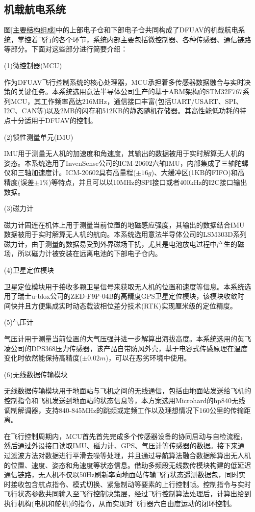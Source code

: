 \subsection{机载航电系统}

图\ref{主要结构组成}中的上部电子仓和下部电子仓共同构成了DFUAV的机载航电系统，掌控着飞行的各个环节，系统内部主要包括微控制器、各种传感器、通信链路等部分。下面对这些部分进行简要介绍：

(1)微控制器(MCU)

    作为DFUAV飞行控制系统的核心处理器，MCU承担着多传感器数据融合与实时决策的关键任务。本系统选用意法半导体公司生产的基于ARM架构的STM32F767系列MCU，其工作频率高达216MHz，通信接口丰富(包括UART/USART、SPI、I2C、CAN等)以及2MB的闪存和512KB的静态随机存储器。其高性能低功耗的特点十分适用于DFUAV的控制。

(2)惯性测量单元(IMU)

    IMU用于测量无人机的加速度和角速度，其输出的数据被用于实时解算无人机的姿态。本系统选用了InvenSense公司的ICM-20602六轴IMU，内部集成了三轴陀螺仪和三轴加速度计。ICM-20602具有高量程($\pm16g$)、大缓冲区(1KB的FIFO)和高精度(误差$\pm1\%$)等特点，并且可以以10MHz的SPI接口或者400kHz的I2C接口输出数据。

(3)磁力计

    磁力计固连在机体上用于测量当前位置的地磁感应强度，其输出的数据结合IMU数据被用于实时解算无人机的航向。本系统选用意法半导体公司的LSM303D系列磁力计，由于测量的数据易受到外界磁场干扰，尤其是电池放电过程中产生的磁场，所以磁力计被安装在远离电池的下部电子仓内。

(4)卫星定位模块

    卫星定位模块用于接收多颗卫星信号来获取无人机的位置和速度等信息。本系统选用了瑞士u-blox公司的ZED-F9P-04B的高精度GPS卫星定位模块，该模块收敛时间快并且方便集成实时动态载波相位差分技术(RTK)实现厘米级的定位精度。
    
(5)气压计

    气压计用于测量当前位置的大气压强并进一步解算出海拔高度。本系统选用的英飞凌公司的DPS368压力传感器，该产品自带防风外壳，基于电容式传感原理在温度变化时依然能保持高精度($\pm0.02m$)，可以在恶劣环境中使用。

(6)无线数据传输模块

    无线数据传输模块用于地面站与飞机之间的无线通信，包括由地面站发送给飞机的控制指令和飞机发送到地面站的状态信息等，本方案选用Microhard的hp840无线调制解调器，支持840-845MHz的跳频或定频工作以及理想情况下160公里的传输距离。

在飞行控制周期内，MCU首先首先完成多个传感器设备的协同启动与自检流程，然后通过外设接口读取IMU、磁力计、GPS、气压计等传感器的数据。接下来通过滤波方法对数据进行平滑去噪等处理，并且通过导航算法融合数据解算出无人机的位置、速度、姿态和角速度等状态信息。借助多频段无线数传模块构建的低延迟通信链路，无人机不仅以50Hz刷新率向地面站传输飞行状态遥测数据包，同时实时接收包含航点指令、模式切换、紧急制动等要素的上行控制帧。控制指令与实时飞行状态参数共同输入至飞行控制决策层，经过飞行控制算法处理后，计算出给到执行机构(电机和舵机)的指令，从而实现对飞行器六自由度运动的闭环控制。


